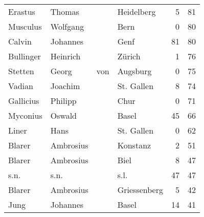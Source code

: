 \begin{center}
\begin{tiny}
\begin{longtabu}{llllrr}
                  Erastus &                             Thomas &             &                                  Heidelberg &          5 &        81 \\
                 Musculus &                           Wolfgang &             &                                        Bern &          0 &        80 \\
                   Calvin &                           Johannes &             &                                        Genf &         81 &        80 \\
                Bullinger &                           Heinrich &             &                                      Zürich &          1 &        76 \\
                  Stetten &                              Georg &         von &                                    Augsburg &          0 &        75 \\
                   Vadian &                            Joachim &             &                                  St. Gallen &          8 &        74 \\
                Gallicius &                            Philipp &             &                                        Chur &          0 &        71 \\
                 Myconius &                             Oswald &             &                                       Basel &         45 &        66 \\
                    Liner &                               Hans &             &                                  St. Gallen &          0 &        62 \\
                   Blarer &                          Ambrosius &             &                                    Konstanz &          2 &        51 \\
                   Blarer &                          Ambrosius &             &                                        Biel &          8 &        47 \\
                     s.n. &                               s.n. &             &                                        s.l. &         47 &        47 \\
                   Blarer &                          Ambrosius &             &                                Griessenberg &          5 &        42 \\
                     Jung &                           Johannes &             &                                       Basel &         14 &        41 \\

\end{longtabu}
\end{tiny}
\end{center}
